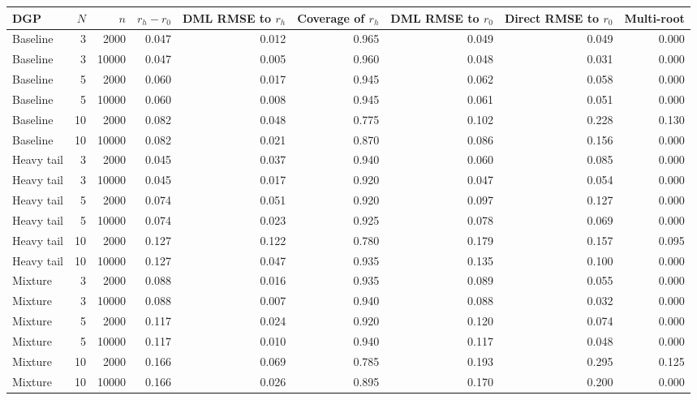 \begin{tabular}{lrrrrrrrr}
\toprule
DGP & $N$ & $n$ & $r_h-r_0$ & DML RMSE to $r_h$ & Coverage of $r_h$ & DML RMSE to $r_0$ & Direct RMSE to $r_0$ & Multi-root \\
\midrule
Baseline & 3 & 2000 & 0.047 & 0.012 & 0.965 & 0.049 & 0.049 & 0.000 \\
Baseline & 3 & 10000 & 0.047 & 0.005 & 0.960 & 0.048 & 0.031 & 0.000 \\
Baseline & 5 & 2000 & 0.060 & 0.017 & 0.945 & 0.062 & 0.058 & 0.000 \\
Baseline & 5 & 10000 & 0.060 & 0.008 & 0.945 & 0.061 & 0.051 & 0.000 \\
Baseline & 10 & 2000 & 0.082 & 0.048 & 0.775 & 0.102 & 0.228 & 0.130 \\
Baseline & 10 & 10000 & 0.082 & 0.021 & 0.870 & 0.086 & 0.156 & 0.000 \\
Heavy tail & 3 & 2000 & 0.045 & 0.037 & 0.940 & 0.060 & 0.085 & 0.000 \\
Heavy tail & 3 & 10000 & 0.045 & 0.017 & 0.920 & 0.047 & 0.054 & 0.000 \\
Heavy tail & 5 & 2000 & 0.074 & 0.051 & 0.920 & 0.097 & 0.127 & 0.000 \\
Heavy tail & 5 & 10000 & 0.074 & 0.023 & 0.925 & 0.078 & 0.069 & 0.000 \\
Heavy tail & 10 & 2000 & 0.127 & 0.122 & 0.780 & 0.179 & 0.157 & 0.095 \\
Heavy tail & 10 & 10000 & 0.127 & 0.047 & 0.935 & 0.135 & 0.100 & 0.000 \\
Mixture & 3 & 2000 & 0.088 & 0.016 & 0.935 & 0.089 & 0.055 & 0.000 \\
Mixture & 3 & 10000 & 0.088 & 0.007 & 0.940 & 0.088 & 0.032 & 0.000 \\
Mixture & 5 & 2000 & 0.117 & 0.024 & 0.920 & 0.120 & 0.074 & 0.000 \\
Mixture & 5 & 10000 & 0.117 & 0.010 & 0.940 & 0.117 & 0.048 & 0.000 \\
Mixture & 10 & 2000 & 0.166 & 0.069 & 0.785 & 0.193 & 0.295 & 0.125 \\
Mixture & 10 & 10000 & 0.166 & 0.026 & 0.895 & 0.170 & 0.200 & 0.000 \\
\bottomrule
\end{tabular}

